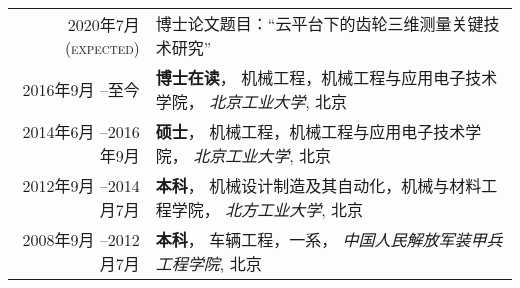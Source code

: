 %
%


\renewcommand{\arraystretch}{1.5}
\begin{tabular}{rl}	
	\textsc{2020年7月(expected)}			  & 博士论文题目：``云平台下的齿轮三维测量关键技术研究''\\
	\textsc{2016年9月 --至今}			  & \textbf{博士在读}， 机械工程，机械工程与应用电子技术学院， \emph{北京工业大学}, 北京\\
	\textsc{2014年6月 --2016年9月}	  &  \textbf{硕士}， 机械工程，机械工程与应用电子技术学院， \emph{北京工业大学}, 北京 \\
	\textsc{2012年9月 --2014月7月} 	&  \textbf{本科}， 机械设计制造及其自动化，机械与材料工程学院， \emph{北方工业大学}, 北京\\
	\textsc{2008年9月 --2012月7月} 	&  \textbf{本科}， 车辆工程，一系， \emph{中国人民解放军装甲兵工程学院}, 北京\\
										
\end{tabular}